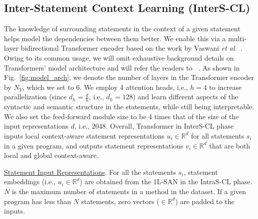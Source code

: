\vspace{2pt}
\subsection{\bf Inter-Statement Context Learning (InterS-CL)}
The knowledge of surrounding statements in the context of a given
statement helps \tool model the dependencies between them better. We
enable this via a multi-layer bidirectional Transformer encoder based
on the work by Vaswani {\em et
  al.}~\cite{Vaswani-2017}. Owing to its common usage, we will omit
exhaustive background details on Transformers' model architecture and
will refer the readers to ~\cite{Vaswani-2017}. As shown in
Fig.~\ref{fig:model_arch}, we denote the number of layers in the
Transformer encoder by $N_Y$, which we set to 6. We employ 4 attention
heads, i.e., $h$$=$$4$ to increase parallelization (since
$d_h$$=$$\frac{d}{h}$, i.e., $d_h$$=$$128$) and learn different
aspects of the syntactic and semantic structure in the statements,
while still being interpretable. We also set the feed-forward module
size to be 4 times that of the size of the input representations $d$,
i.e., 2048. Overall, Transformer in InterS-CL phase inputs
local context-aware statement representations $u_i \in \mathbb{R}^d$
for all statements $s_i$ in a given program, and outputs statement
representations $v_i \in \mathbb{R}^d$ that are both local and global
context-aware.

\vspace{1pt} \underline{Statement Input Representations}. For all the
statements $s_i$, statement embeddings (i.e., $u_i \in
\mathbb{R}^d$) are obtained from the 1L-SAN in the IntraS-CL phase.
$N$ is the maximum number of statements in a method in the dataset. If
a given program has less than $N$ statements,
zero vectors ($\in \mathbb{R}^d$) are padded to the inputs.



